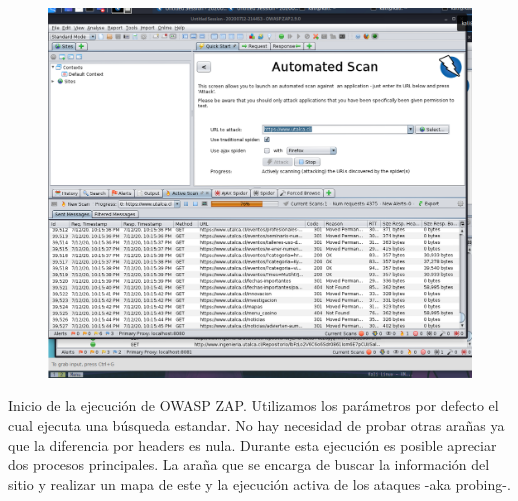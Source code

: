 \documentclass[11pt]{utalcaDoc}
\begin{document}
\begin{figure}[H]
	\centering
	\includegraphics[width=.75\textwidth]{images2/zap1.png}
\end{figure}
Inicio de la ejecución de OWASP ZAP. Utilizamos los parámetros por defecto el cual ejecuta una búsqueda estandar. No hay necesidad de probar otras arañas ya que la diferencia por headers es nula. Durante esta ejecución es posible apreciar dos procesos principales. La araña que se encarga de buscar la información del sitio y realizar un mapa de este y la ejecución activa de los ataques -aka probing-.
\end{document}
